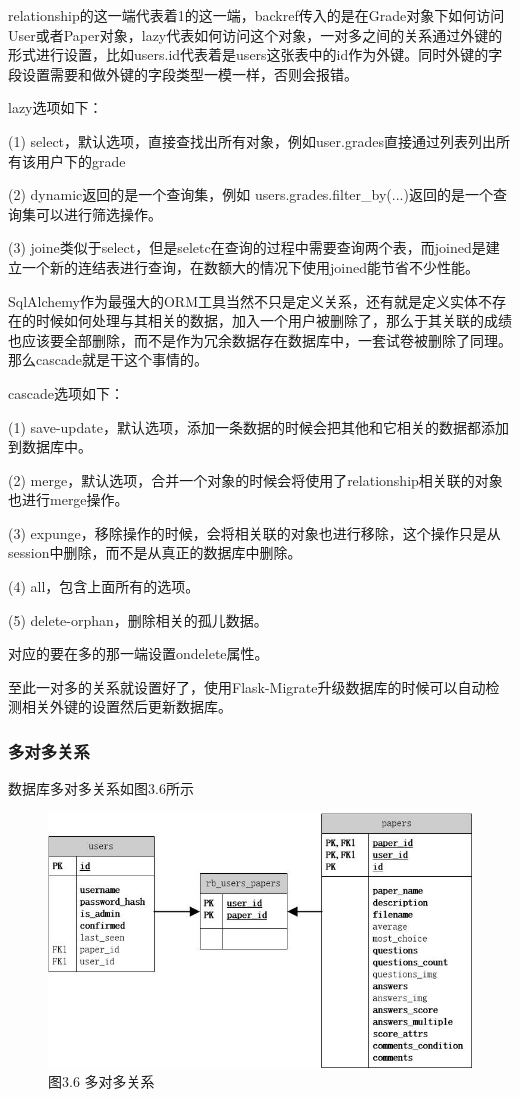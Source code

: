 relationship的这一端代表着1的这一端，backref传入的是在Grade对象下如何访问User或者Paper对象，lazy代表如何访问这个对象，一对多之间的关系通过外键的形式进行设置，比如users.id代表着是users这张表中的id作为外键。同时外键的字段设置需要和做外键的字段类型一模一样，否则会报错。

lazy选项如下：

(1) select，默认选项，直接查找出所有对象，例如user.grades直接通过列表列出所有该用户下的grade

(2) dynamic返回的是一个查询集，例如 users.grades.filter\_by(...)返回的是一个查询集可以进行筛选操作。

(3) joine类似于select，但是seletc在查询的过程中需要查询两个表，而joined是建立一个新的连结表进行查询，在数额大的情况下使用joined能节省不少性能。

SqlAlchemy作为最强大的ORM工具当然不只是定义关系，还有就是定义实体不存在的时候如何处理与其相关的数据，加入一个用户被删除了，那么于其关联的成绩也应该要全部删除，而不是作为冗余数据存在数据库中，一套试卷被删除了同理。那么cascade就是干这个事情的。

cascade选项如下：

(1) save-update，默认选项，添加一条数据的时候会把其他和它相关的数据都添加到数据库中。

(2) merge，默认选项，合并一个对象的时候会将使用了relationship相关联的对象也进行merge操作。

(3) expunge，移除操作的时候，会将相关联的对象也进行移除，这个操作只是从session中删除，而不是从真正的数据库中删除。

(4) all，包含上面所有的选项。

(5) delete-orphan，删除相关的孤儿数据。

对应的要在多的那一端设置ondelete属性。

至此一对多的关系就设置好了，使用Flask-Migrate升级数据库的时候可以自动检测相关外键的设置然后更新数据库。

\subsubsection{多对多关系}

数据库多对多关系如图3.6所示

\begin{figure}[thbp!]
	\centering
	\includegraphics[width=1.0\linewidth]{figure/rb_users_papers}
	\label{fig:rb_users_papers} \\
		图3.6 多对多关系
\end{figure}

